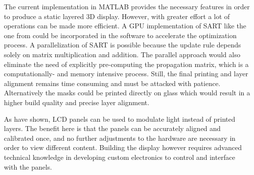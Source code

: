 The current implementation in MATLAB provides the necessary features in order to produce a static layered 3D display.
However, with greater effort a lot of operations can be made more efficient.
A GPU implementation of SART like the one from \cite{SARTGPU} could be incorporated in the software to accelerate the optimization process.
A parallelization of SART is possible because the update rule depends solely on matrix multiplication and addition.
The parallel approach would also eliminate the need of explicitly pre-computing the propagation matrix, which is a computationally- and memory intensive process.
Still, the final printing and layer alignment remains time consuming and must be attacked with patience.
Alternatively the masks could be printed directly on glass which would result in a higher build quality and precise layer alignment.

As \cite{WetzsteinTensor} have shown, LCD panels can be used to modulate light instead of printed layers.
The benefit here is that the panels can be accurately aligned and calibrated once, and no further adjustments to the hardware are necessary in order to view different content.
Building the display however requires advanced technical knowledge in developing custom electronics to control and interface with the panels.